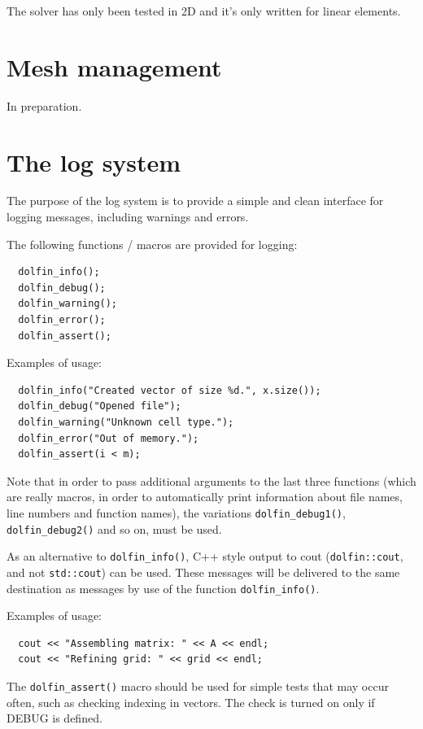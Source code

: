 \documentclass[12pt]{article}
\begin{document}
The solver has only been tested in 2D and it's only written for linear elements.

\cleardoublepage
\section{Mesh management}

In preparation.

\cleardoublepage
\section{The log system}

The purpose of the log system is to provide a simple and
clean interface for logging messages, including warnings
and errors.

The following functions / macros are provided for logging:

\begin{verbatim}
  dolfin_info();
  dolfin_debug();
  dolfin_warning();
  dolfin_error();
  dolfin_assert();
\end{verbatim}

Examples of usage:

\begin{verbatim}
  dolfin_info("Created vector of size %d.", x.size());
  dolfin_debug("Opened file");
  dolfin_warning("Unknown cell type.");
  dolfin_error("Out of memory.");
  dolfin_assert(i < m);
\end{verbatim}

Note that in order to pass additional arguments to the last
three functions (which are really macros, in order to
automatically print information about file names, line numbers
and function names), the variations \texttt{dolfin\_debug1()},
\texttt{dolfin\_debug2()} and so on, must be used.

As an alternative to \texttt{dolfin\_info()}, C++ style output to cout
(\texttt{dolfin::cout}, and not \texttt{std::cout}) can be used. These messages
will be delivered to the same destination as messages by use
of the function \texttt{dolfin\_info()}.

Examples of usage:

\begin{verbatim}
  cout << "Assembling matrix: " << A << endl;
  cout << "Refining grid: " << grid << endl;
\end{verbatim}

The \texttt{dolfin\_assert()} macro should be used for simple tests that
may occur often, such as checking indexing in vectors. The check
is turned on only if DEBUG is defined.
\end{document}
